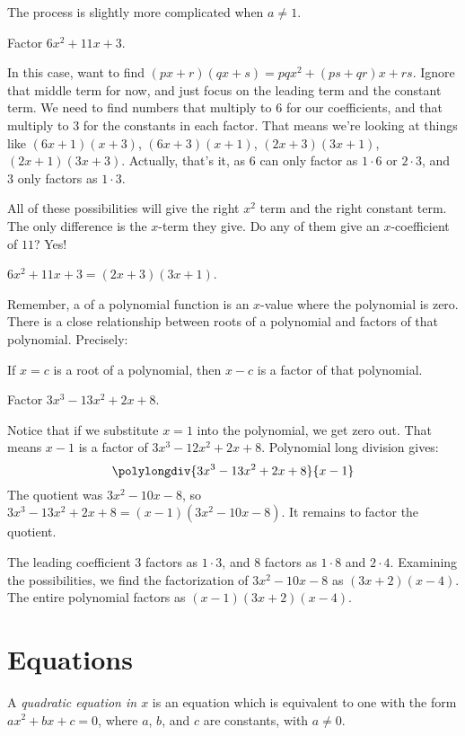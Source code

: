 \documentclass{ximera}
\begin{document}
The process is slightly more complicated when $a \neq 1$.
\begin{example}
	Factor $6x^2 + 11 x + 3$.
	\begin{explanation}
		In this case, want to find $(px+r)(qx+s) = pq x^2 + (ps+qr) x+ rs$.  Ignore that middle term for now, and just focus on the leading term and the constant term.
		We need to find numbers that multiply to $6$ for our coefficients, and that multiply to $3$ for the constants in each factor.
		That means we're looking at things like $(6x+1)(x+3)$, $(6x+3)(x+1)$, $(2x+3)(3x+1)$, $(2x+1)(3x+3)$.   Actually, that's it, as $6$ can only
		factor as $1 \cdot 6$ or $2 \cdot 3$, and $3$ only factors as $1 \cdot 3$.
		
		All of these possibilities will give the right $x^2$ term and the right constant term.  The only difference is the $x$-term they give.  Do any of them
		give an $x$-coefficient of $11$?  Yes!
		
		$6x^2+11x+3 = (2x+3)(3x+1)$.
	\end{explanation}
\end{example}

Remember, a  of a polynomial function is an $x$-value where the polynomial is zero. 
There is a close relationship between roots of a polynomial and factors of that polynomial.  Precisely:
\begin{theorem}
If $x=c$ is a root of a polynomial, then $x-c$ is a factor of that polynomial.
\end{theorem}

\begin{example}
	Factor $3x^3-13x^2+2x+8$.
	\begin{explanation}
		Notice that if we substitute $x=1$ into the polynomial, we get zero out.  That means $x-1$ is a factor of $3x^3-12x^2+2x+8$.
		Polynomial long division gives:
		\[\polylongdiv{3x^3-13x^2+2x+8}{x-1}\]
		The quotient was $3x^2-10x-8$, so $3x^3-13x^2+2x+8 = (x-1)(3x^2-10x-8)$.  It remains to factor the quotient.
		
		The leading coefficient $3$ factors as $1 \cdot 3$, and $8$ factors as $1 \cdot 8$ and $2 \cdot 4$.  Examining the possibilities, we find the factorization
		of $3x^2-10x-8$ as $(3x+2)(x-4)$.  The entire polynomial factors as $(x-1)(3x+2)(x-4)$.
	\end{explanation}
\end{example}



\section{Equations}
A \emph{quadratic equation in $x$} is an equation which is equivalent to one with the form
	$ax^2 + bx + c = 0$, where $a$, $b$, and $c$ are constants, with $a \neq 0$.
\end{document}

